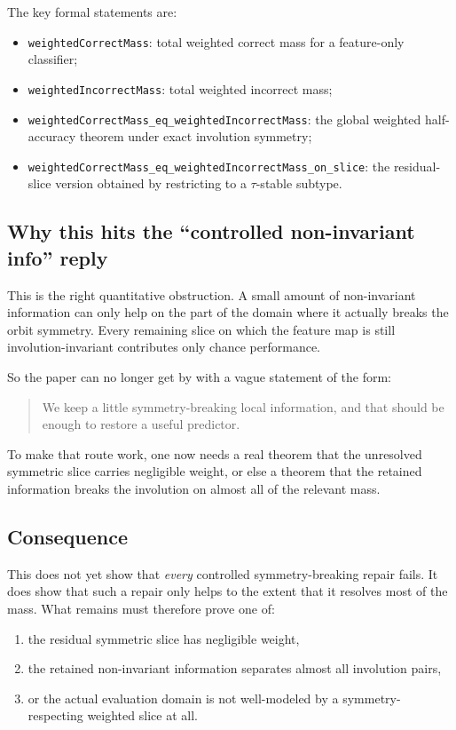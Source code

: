 \documentclass[11pt]{article}
\theoremstyle{remark}
\begin{document}
\noindent
The key formal statements are:
\begin{itemize}[leftmargin=1.5em]
  \item \texttt{weightedCorrectMass}: total weighted correct mass for a feature-only classifier;
  \item \texttt{weightedIncorrectMass}: total weighted incorrect mass;
  \item \texttt{weightedCorrectMass\_eq\_weightedIncorrectMass}: the global weighted half-accuracy
  theorem under exact involution symmetry;
  \item \texttt{weightedCorrectMass\_eq\_weightedIncorrectMass\_on\_slice}: the residual-slice
  version obtained by restricting to a \(\tau\)-stable subtype.
\end{itemize}

\subsection{Why this hits the ``controlled non-invariant info'' reply}

This is the right quantitative obstruction.  A small amount of non-invariant information can only
help on the part of the domain where it actually breaks the orbit symmetry.  Every remaining
slice on which the feature map is still involution-invariant contributes only chance performance.

So the paper can no longer get by with a vague statement of the form:
\begin{quote}
We keep a little symmetry-breaking local information, and that should be enough to restore a
useful predictor.
\end{quote}

To make that route work, one now needs a real theorem that the unresolved symmetric slice carries
negligible weight, or else a theorem that the retained information breaks the involution on almost
all of the relevant mass.

\subsection{Consequence}

This does not yet show that \emph{every} controlled symmetry-breaking repair fails.  It does show
that such a repair only helps to the extent that it resolves most of the mass.  What remains must
therefore prove one of:
\begin{enumerate}[leftmargin=1.5em]
  \item the residual symmetric slice has negligible weight,
  \item the retained non-invariant information separates almost all involution pairs,
  \item or the actual evaluation domain is not well-modeled by a symmetry-respecting weighted
  slice at all.
\end{enumerate}
\end{document}
